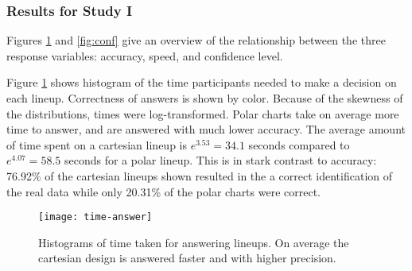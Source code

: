 
\subsubsection{Results for Study I}

Figures \ref{fig:time} and \ref{fig:conf} give an overview of the relationship between the three response variables: accuracy, speed, and confidence level.

Figure \ref{fig:time} shows histogram of the time participants needed to make a decision on each lineup. Correctness of answers is shown by color.  Because of the skewness of the distributions, times were log-transformed. Polar charts take on average more time to answer, and are answered with much lower accuracy. 
The average amount of time spent on a cartesian lineup is $e^{3.53} = 34.1$ seconds compared to $e^{4.07}=58.5$ seconds for a polar lineup.
This is in stark contrast to accuracy: 76.92\% of the cartesian lineups shown resulted in the a correct identification of the real data while only 20.31\% of the polar charts were correct.


\begin{figure}[hbtp] %
   \centering
   \texttt{[image: time-answer]} 
   \caption{Histograms of time taken for answering lineups. On average the cartesian design is answered faster and with higher precision.}
   \label{fig:time}
\end{figure}

